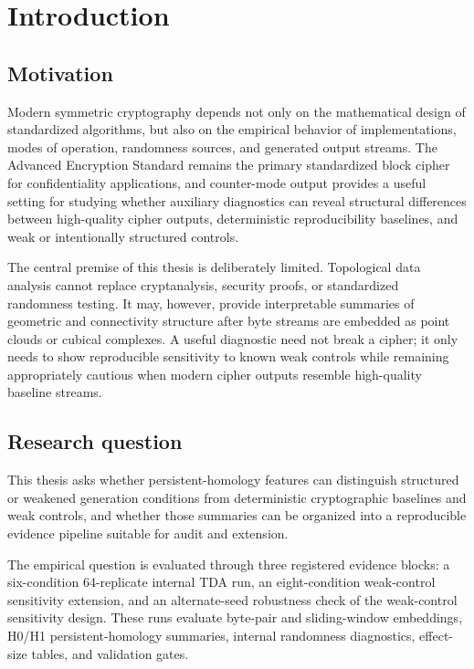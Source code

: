 
\section{Introduction}
\label{sec:introduction}

\subsection{Motivation}
\label{subsec:introduction-motivation}

Modern symmetric cryptography depends not only on the mathematical design of standardized algorithms, but also on the empirical behavior of implementations, modes of operation, randomness sources, and generated output streams. The Advanced Encryption Standard remains the primary standardized block cipher for confidentiality applications, and counter-mode output provides a useful setting for studying whether auxiliary diagnostics can reveal structural differences between high-quality cipher outputs, deterministic reproducibility baselines, and weak or intentionally structured controls.

The central premise of this thesis is deliberately limited. Topological data analysis cannot replace cryptanalysis, security proofs, or standardized randomness testing. It may, however, provide interpretable summaries of geometric and connectivity structure after byte streams are embedded as point clouds or cubical complexes. A useful diagnostic need not break a cipher; it only needs to show reproducible sensitivity to known weak controls while remaining appropriately cautious when modern cipher outputs resemble high-quality baseline streams.

\subsection{Research question}
\label{subsec:research-question}

This thesis asks whether persistent-homology features can distinguish structured or weakened generation conditions from deterministic cryptographic baselines and weak controls, and whether those summaries can be organized into a reproducible evidence pipeline suitable for audit and extension.

The empirical question is evaluated through three registered evidence blocks: a six-condition 64-replicate internal TDA run, an eight-condition weak-control sensitivity extension, and an alternate-seed robustness check of the weak-control sensitivity design. These runs evaluate byte-pair and sliding-window embeddings, H0/H1 persistent-homology summaries, internal randomness diagnostics, effect-size tables, and validation gates.


